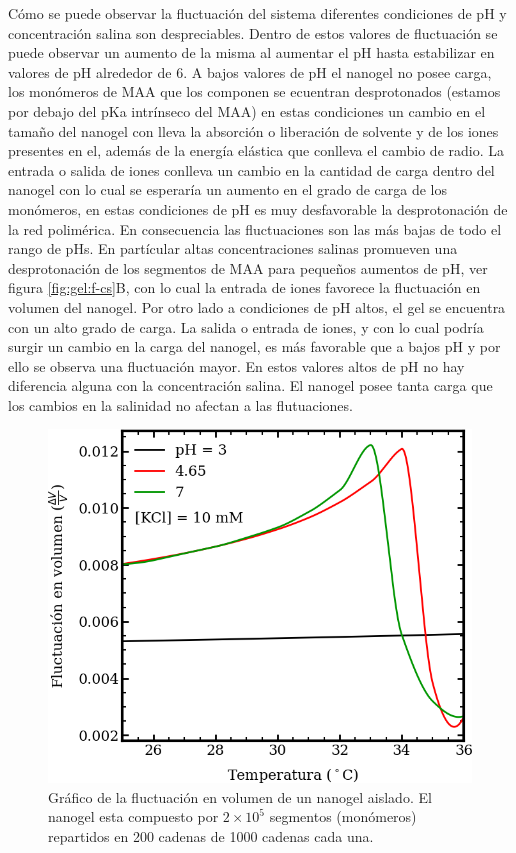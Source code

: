 C\'omo se puede observar la fluctuaci\'on del sistema diferentes condiciones de pH y concentraci\'on salina son despreciables. 
Dentro de estos valores de fluctuaci\'on se puede observar un aumento de la misma al aumentar el pH hasta estabilizar en valores de pH alrededor de 6.
A bajos valores de pH el nanogel no posee carga, los mon\'omeros de MAA que los componen se ecuentran desprotonados (estamos por debajo del pKa intr\'inseco del MAA) en estas condiciones un cambio en el tama\~no del nanogel con lleva la absorci\'on o liberaci\'on de solvente y de los iones presentes en el, adem\'as de la energ\'ia el\'astica que conlleva el cambio de radio.
La entrada o salida de iones conlleva un cambio en la cantidad de carga dentro del nanogel con lo cual se esperar\'ia un aumento en el grado de carga de los mon\'omeros, en estas condiciones de pH es muy desfavorable la desprotonaci\'on de la red polim\'erica. En consecuencia las fluctuaciones son las m\'as bajas de todo el rango de pHs.
En part\'icular altas concentraciones salinas promueven una desprotonaci\'on de los segmentos de MAA para peque\~nos aumentos de pH, ver figura \ref{fig:gel:f-cs}B, con lo cual la entrada de iones favorece la fluctuaci\'on en volumen del nanogel. 
Por otro lado a condiciones de pH altos, el gel se encuentra con un alto grado de carga. La salida o entrada de iones, y  con lo cual podr\'ia surgir un cambio en la carga del nanogel,  es m\'as favorable que a bajos pH y por ello se observa una fluctuaci\'on mayor. En estos valores altos de pH no hay diferencia alguna con la concentraci\'on salina. El nanogel posee tanta carga que los cambios en la salinidad no afectan a las flutuaciones.





\begin{figure}[!tb]
	\centering
	\includegraphics[width=1\linewidth]{Figures/graph-mc/fluct-T.png}
	\caption{Gr\'afico de la fluctuaci\'on en volumen de un nanogel aislado. El nanogel esta compuesto por $2\times 10^5$ segmentos (mon\'omeros) repartidos en 200 cadenas de 1000 cadenas cada una.}
	\label{fig:mc:dvv-Ti}
\end{figure}

